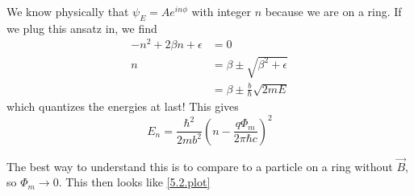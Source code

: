 \documentclass[10pt]{report}
\begin{document}
We know physically that $\psi_E = Ae^{in\phi}$ with integer $n$ because we are on a ring. If we plug this ansatz in, we find
\begin{align}
    -n^2 + 2\beta n + \epsilon &= 0\\
    n &= \beta \pm \sqrt{\beta^2 + \epsilon}\\
    &= \beta \pm \frac{b}{\hbar}\sqrt{2mE}
\end{align}
which quantizes the energies at last! This gives
\begin{equation}
    \boxed{E_n = \frac{\hbar^2}{2mb^2}\left( n - \frac{q\Phi_m}{2\pi\hbar c} \right)^2}
\end{equation}

The best way to understand this is to compare to a particle on a ring without $\vec{B}$, so $\Phi_m \to 0$. This then looks like \ref{5.2.plot}
\end{document}
